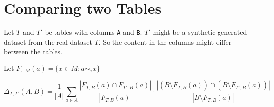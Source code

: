 \section{Comparing two Tables}

Let $T$ and $T'$ be tables with columns \texttt{A} and \texttt{B}.
$T'$ might be a synthetic generated dataset from the real dataset $T$.
So the content in the columns might differ between the tables.

Let $F_{\tau, M}(a) = \{ x \in M : a \sim_\tau x \}$

\begin{equation}
  \Delta_{T,T'}(A, B) = \frac{1}{|A|} 
    \sum_{a \in A}
    \frac{\left|F_{T, B}(a) \cap F_{T', B}(a)\right|}{|F_{T, B}(a)|}
    \cdot
    \frac{\left|\left(B \setminus F_{T, B}(a)\right) \cap \left(B \setminus F_{T', B}(a)\right)\right|}{|B \setminus F_{T, B}(a)|}
\end{equation}

